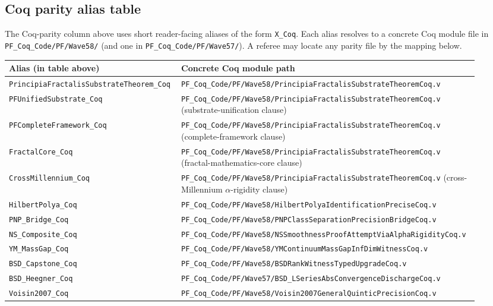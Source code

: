 \documentclass[11pt,a4paper]{article}
\theoremstyle{definition}
\theoremstyle{remark}
\newcommand{\lean}[1]{\texttt{\small #1}}
\begin{document}
\subsection{Coq parity alias table}
\label{sec:coq-alias-table}

The Coq-parity column above uses short reader-facing aliases of
the form \lean{X\_Coq}. Each alias resolves to a concrete Coq
module file in \texttt{PF\_Coq\_Code/PF/Wave58/} (and one in
\texttt{PF\_Coq\_Code/PF/Wave57/}). A referee may locate any
parity file by the mapping below.

\begin{longtable}{p{0.32\linewidth} p{0.60\linewidth}}
\toprule
\textbf{Alias (in table above)} & \textbf{Concrete Coq module path} \\
\midrule
\endhead
\lean{PrincipiaFractalisSubstrateTheorem\_Coq} & \texttt{PF\_Coq\_Code/PF/Wave58/PrincipiaFractalisSubstrateTheoremCoq.v} \\
\lean{PFUnifiedSubstrate\_Coq} & \texttt{PF\_Coq\_Code/PF/Wave58/PrincipiaFractalisSubstrateTheoremCoq.v} (substrate-unification clause) \\
\lean{PFCompleteFramework\_Coq} & \texttt{PF\_Coq\_Code/PF/Wave58/PrincipiaFractalisSubstrateTheoremCoq.v} (complete-framework clause) \\
\lean{FractalCore\_Coq} & \texttt{PF\_Coq\_Code/PF/Wave58/PrincipiaFractalisSubstrateTheoremCoq.v} (fractal-mathematics-core clause) \\
\lean{CrossMillennium\_Coq} & \texttt{PF\_Coq\_Code/PF/Wave58/PrincipiaFractalisSubstrateTheoremCoq.v} (cross-Millennium $\alpha$-rigidity clause) \\
\lean{HilbertPolya\_Coq} & \texttt{PF\_Coq\_Code/PF/Wave58/HilbertPolyaIdentificationPreciseCoq.v} \\
\lean{PNP\_Bridge\_Coq} & \texttt{PF\_Coq\_Code/PF/Wave58/PNPClassSeparationPrecisionBridgeCoq.v} \\
\lean{NS\_Composite\_Coq} & \texttt{PF\_Coq\_Code/PF/Wave58/NSSmoothnessProofAttemptViaAlphaRigidityCoq.v} \\
\lean{YM\_MassGap\_Coq} & \texttt{PF\_Coq\_Code/PF/Wave58/YMContinuumMassGapInfDimWitnessCoq.v} \\
\lean{BSD\_Capstone\_Coq} & \texttt{PF\_Coq\_Code/PF/Wave58/BSDRankWitnessTypedUpgradeCoq.v} \\
\lean{BSD\_Heegner\_Coq} & \texttt{PF\_Coq\_Code/PF/Wave57/BSD\_LSeriesAbsConvergenceDischargeCoq.v} \\
\lean{Voisin2007\_Coq} & \texttt{PF\_Coq\_Code/PF/Wave58/Voisin2007GeneralQuinticPrecisionCoq.v} \\

\end{longtable}
\end{document}
